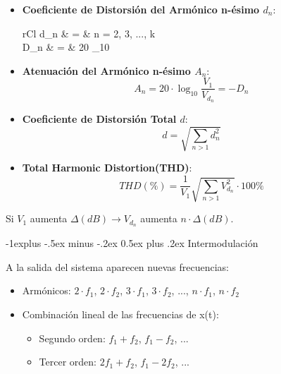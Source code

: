 \documentclass[10pt,portrait, twocolumn]{article}
\makeatletter
\renewcommand{\subsection}{\@startsection{subsection}{2}{0mm}%
                                {-1explus -.5ex minus -.2ex}%
                                {0.5ex plus .2ex}%
                                {\normalfont\normalsize\bfseries}}
\makeatother
\begin{document}
\begin{landscape}
\begin{multicols}{3}
\begin{itemize}
	\item \textbf{Coeficiente de Distorsión del Armónico n-ésimo $d_n$}:
		\begin{IEEEeqnarray*}{rCl}
			d_n & = &  \hspace{5pt} n = 2, 3, ..., k \\
			D_n & = & 20 \cdot \log_{10} 	
		\end{IEEEeqnarray*}
	\item \textbf{Atenuación del Armónico n-ésimo $A_n$}:
		\begin{equation*}
			A_n = 20 \cdot \log_10 \frac{V_1}{V_{d_n}} = -D_n
		\end{equation*}
	\item \textbf{Coeficiente de Distorsión Total $d$}:
		\begin{equation*}
			d = \sqrt{\sum_{n>1} d_n^2}
		\end{equation*}
	\item \textbf{Total Harmonic Distortion(THD)}:
		\begin{equation*}
			THD(\%) = \frac{1}{V_1} \sqrt{\sum_{n>1} V_{d_n}^2} \cdot 100 \%
		\end{equation*}
\end{itemize}

Si $V_1$ aumenta $\Delta (dB) \rightarrow V_{d_n}$ aumenta $n \cdot \Delta (dB)$. 


\subsection{Intermodulación}

\begin{center}
\end{center}

A la salida del sistema aparecen nuevas frecuencias:

\begin{itemize}
	\item Armónicos: $2 \cdot f_1$, $2 \cdot f_2$, $3 \cdot f_1$, $3 \cdot f_2$, ..., $n \cdot f_1$, $n \cdot f_2$
	\item Combinación lineal de las frecuencias de x(t):
		\begin{itemize}
			\item Segundo orden: $f_1 + f_2$, $f_1 - f_2$, ...
			\item Tercer orden: $2 f_1 + f_2$, $f_1 - 2 f_2$, ... 
		\end{itemize} 
\end{itemize}


\end{multicols}
\end{landscape}
\end{document}
